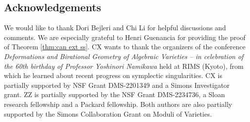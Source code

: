 \documentclass[12pt]{amsart}
\theoremstyle{definition}
\numberwithin{equation}{section}
\begin{document}
\subsection*{Acknowledgements}

We would like to thank Dori Bejleri and Chi Li for helpful discussions and comments. We are especially grateful to Henri Guenancia for providing the proof of Theorem \ref{thm:can ext ss}. CX wants to thank the organizers of the conference {\it Deformations and Birational Geometry of Algebraic Varieties -- in celebration of the 60th birthday of Professor Yoshinori Namikawa} held at RIMS (Kyoto), from which he learned about recent progress on symplectic singularities. CX is partially supported by NSF Grant DMS-2201349 and a Simons Investigator grant.
ZZ is partially supported by the NSF Grant DMS-2234736, a Sloan research fellowship and a Packard fellowship.
Both authors are also partially supported by the Simons Collaboration Grant on Moduli of Varieties.
\end{document}

